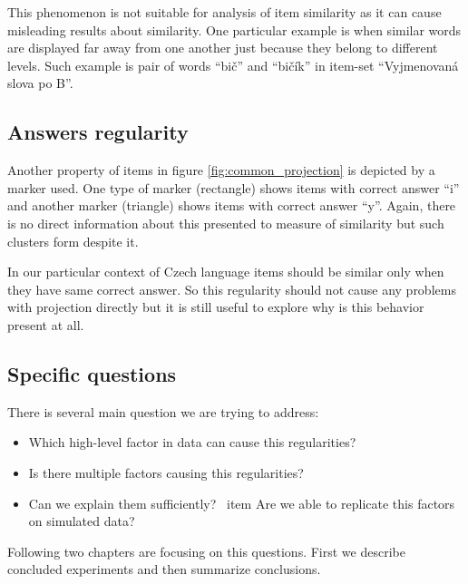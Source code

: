 \documentclass[
  digital, %
  table,   %
  nolof,     %
  nolot,     %
  nocover,
  color,
  final, %
]{fithesis3}
\begin{document}

This phenomenon is not suitable for analysis of item similarity as it can cause misleading results about similarity. One particular example is when similar words are displayed far away from one another just because they belong to different levels. Such example is pair of words ``bič'' and ``bičík'' in item-set ``Vyjmenovaná slova po B''.


\subsection{Answers regularity}\label{answers-regularity}

Another property of items in figure \ref{fig:common_projection} is depicted by a marker used. One type of marker (rectangle) shows items with correct answer ``i'' and another marker (triangle) shows items with correct answer ``y''. Again, there is no direct information about this presented to measure of similarity but such clusters form despite it.

In our particular context of Czech language items should be similar only when they have same correct answer. So this regularity should not cause any problems with projection directly but it is still useful to explore why is this behavior present at all.


\subsection{Specific questions}\label{specific-questions}

There is several main question we are trying to address:

\begin{itemize}
 \item Which high-level factor in data can cause this regularities?
 \item Is there multiple factors causing this regularities?
 \item Can we explain them sufficiently?
 \ item Are we able to replicate this factors on simulated data?
\end{itemize}


Following two chapters are focusing on this questions. First we describe concluded experiments and then summarize conclusions.
\end{document}
